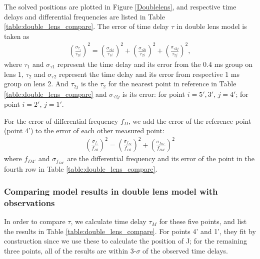 \documentclass[useAMS,usenatbib]{mn2e}
\begin{document}
The solved positions are plotted in Figure \ref{Doublelens}, and
respective time delays and differential frequencies are listed in
Table \ref{table:double_lens_compare}. The error of time delay $\tau$
in double lens model is taken as
\begin{equation}
\begin{aligned}
(\frac{\sigma_{\tau_i}}{\tau_{2i}})^2 = (\frac{\sigma_{\tau1i}}{\tau_{1i}})^2+(\frac{\sigma_{\tau2i}}{\tau_{2i}})^2 + (\frac{\sigma_{\tau2j}}{\tau_{2j}})^2,
\end{aligned}
\end{equation}
where $\tau_1$ and $\sigma_{\tau1}$ represent the time delay and its
error from the $0.4$ ms group on lens $1$, $\tau_2$ and
$\sigma_{\tau2}$ represent the time delay and its error from
respective $1$ ms group on lens 2. And $\tau_{2j}$ is the $\tau_2$ for
the nearest point in reference in Table
\ref{table:double_lens_compare} and $\sigma_{\tau2j}$ is its error:
for point $i=5',3'$, $j=4'$; for point $i=2'$, $j=1'$.

For the error of differential frequency $f_D$, we add the error of the reference point (point 4') to the error of each other measured point:
\begin{equation}
\begin{aligned}
(\frac{\sigma_{f_i}}{f_{Di}})^2=(\frac{\sigma_{f_{Di}}}{f_{Di}})^2+(\frac{\sigma_{f_{D4'}}}{f_{D4'}})^2
\end{aligned}
\end{equation}
where $f_{D4'}$ and $\sigma_{f_{D4'}}$ are the differential frequency
and its error of the point in the fourth row in Table
\ref{table:double_lens_compare}.

\subsubsection{Comparing model results in double lens model with observations}
In order to compare $\tau$, we calculate time delay $\tau_M$ for these five
points, and list the results in Table
\ref{table:double_lens_compare}. For points 4' and 1', they fit by
construction since we use these to calculate the position of J; for the remaining three points, all of the results are within 3-$\sigma$ of the observed time delays.
\end{document}
